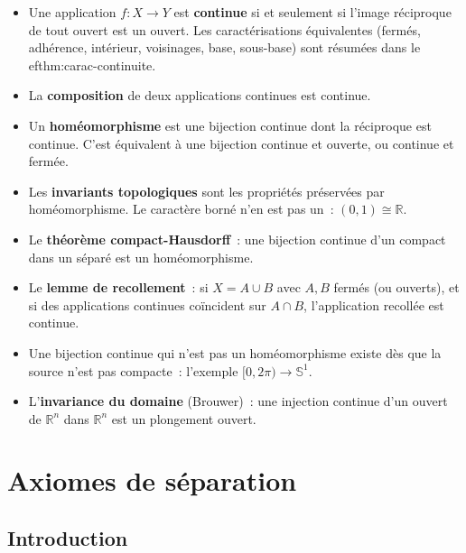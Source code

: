 \documentclass[12pt,a4paper,openany]{book}
\theoremstyle{definition}
\theoremstyle{cours}
\theoremstyle{coursnormal}
\newcommand{\R}{\mathbb{R}}
\begin{document}
\begin{itemize}
  \item Une application $f\colon X\to Y$ est \textbf{continue} si et seulement
    si l'image réciproque de tout ouvert est un ouvert. Les caractérisations
    équivalentes (fermés, adhérence, intérieur, voisinages, base, sous-base)
    sont résumées dans le 
ef{thm:carac-continuite}.
  \item La \textbf{composition} de deux applications continues est continue.
  \item Un \textbf{homéomorphisme} est une bijection continue dont la
    réciproque est continue. C'est équivalent à une bijection continue et
    ouverte, ou continue et fermée.
  \item Les \textbf{invariants topologiques} sont les propriétés préservées par
    homéomorphisme. Le caractère borné n'en est pas un~: $(0,1)\cong\R$.
  \item Le \textbf{théorème compact-Hausdorff}~: une bijection continue d'un
    compact dans un séparé est un homéomorphisme.
  \item Le \textbf{lemme de recollement}~: si $X=A\cup B$ avec $A,B$ fermés
    (ou ouverts), et si des applications continues coïncident sur $A\cap B$,
    l'application recollée est continue.
  \item Une bijection continue qui n'est pas un homéomorphisme existe dès que
    la source n'est pas compacte~: l'exemple
    $[0,2\pi)\to\mathbb{S}^1$.
  \item L'\textbf{invariance du domaine} (Brouwer)~: une injection continue
    d'un ouvert de $\R^n$ dans $\R^n$ est un plongement ouvert.
\end{itemize}


\chapter{Axiomes de séparation}\label{ch:separation}

\section*{Introduction}
\end{document}
